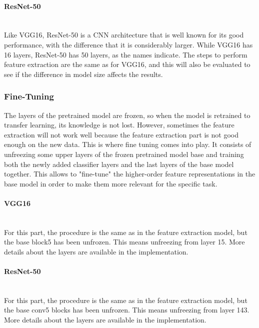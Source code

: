 \documentclass[11pt, a4paper]{article}
\begin{document}
\paragraph{ResNet-50}\mbox{}\\
Like VGG16, ResNet-50 is a CNN architecture that is well known for its good performance, with the difference that it is considerably larger. While VGG16 has 16 layers, ResNet-50 has 50 layers, as the names indicate. The steps to perform feature extraction are the same as for VGG16, and this will also be evaluated to see if the difference in model size affects the results.
\subsubsection{Fine-Tuning}
The layers of the pretrained model are frozen, so when the model is retrained to transfer learning, its knowledge is not lost. However, sometimes the feature extraction will not work well because the feature extraction part is not good enough on the new data. This is where fine tuning comes into play. It consists of unfreezing some upper layers of the frozen pretrained model base and training both the newly added classifier layers and the last layers of the base model together. This allows to "fine-tune" the higher-order feature representations in the base model in order to make them more relevant for the specific task.
\paragraph{VGG16}\mbox{}\\
For this part, the procedure is the same as in the feature extraction model, but the base block5 has been unfrozen. This means unfreezing from layer 15. More details about the layers are available in the implementation.
\paragraph{ResNet-50}\mbox{}\\
For this part, the procedure is the same as in the feature extraction model, but the base conv5 blocks has been unfrozen. This means unfreezing from layer 143. More details about the layers are available in the implementation.
\end{document}
